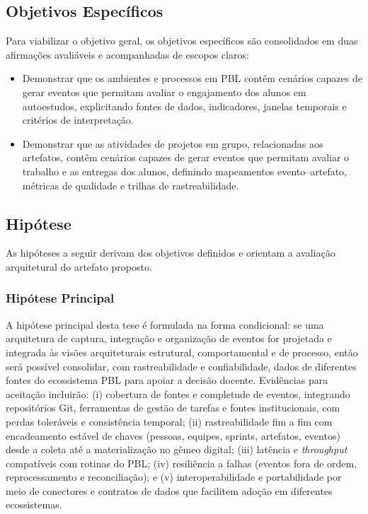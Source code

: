 \documentclass[12pt,a4paper]{article}
\begin{document}
\subsection{Objetivos Específicos}

Para viabilizar o objetivo geral, os objetivos específicos são consolidados em duas afirmações avaliáveis e acompanhadas de escopos claros:

\begin{itemize}
  \item Demonstrar que os ambientes e processos em PBL contêm cenários capazes de gerar eventos que permitam avaliar o engajamento dos alunos em autoestudos, explicitando fontes de dados, indicadores, janelas temporais e critérios de interpretação.
  \item Demonstrar que as atividades de projetos em grupo, relacionadas aos artefatos, contêm cenários capazes de gerar eventos que permitam avaliar o trabalho e as entregas dos alunos, definindo mapeamentos evento–artefato, métricas de qualidade e trilhas de rastreabilidade.
\end{itemize}

\subsection{Hipótese}

As hipóteses a seguir derivam dos objetivos definidos e orientam a avaliação 
arquitetural do artefato proposto.

\subsubsection{Hipótese Principal}

A hipótese principal desta tese é formulada na forma condicional: se uma arquitetura de captura, integração e organização de eventos for projetada e integrada às visões arquiteturais estrutural, comportamental e de processo, então será possível consolidar, com rastreabilidade e confiabilidade, dados de diferentes fontes do ecossistema PBL para apoiar a decisão docente. Evidências para aceitação incluirão: (i) cobertura de fontes e completude de eventos, integrando repositórios Git, ferramentas de gestão de tarefas e fontes institucionais, com perdas toleráveis e consistência temporal; (ii) rastreabilidade fim a fim com encadeamento estável de chaves (pessoas, equipes, sprints, artefatos, eventos) desde a coleta até a materialização no gêmeo digital; (iii) latência e \textit{throughput} compatíveis com rotinas do PBL; (iv) resiliência a falhas (eventos fora de ordem, reprocessamento e reconciliação); e (v) interoperabilidade e portabilidade por meio de conectores e contratos de dados que facilitem adoção em diferentes ecossistemas.
\end{document}
